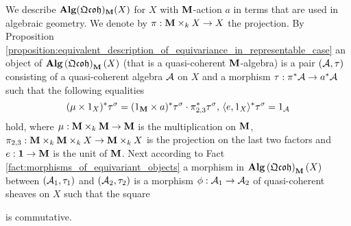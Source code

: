 \begin{remark}\label{remark:description_of_equivariant_qc_algebras_in_the_usual_way}
We describe $\mathbf{Alg}(\mathfrak{Qcoh})_{\mathbf{M}}(X)$ for $X$ with $\mathbf{M}$-action $a$ in terms that are used in algebraic geometry. We denote by $\pi:\mathbf{M}\times_kX\rightarrow X$ the projection. By Proposition \ref{proposition:equivalent_description_of_equivariance_in_representable_case} an object of $\mathbf{Alg}\left(\mathfrak{Qcoh}\right)_{\mathbf{M}}(X)$ (that is a quasi-coherent $\mathbf{M}$-algebra) is a pair $({\mathcal A},\tau)$ consisting of a quasi-coherent algebra ${\mathcal A}$ on $X$ and a morphism $\tau:\pi^*{\mathcal A} \rightarrow a^* {\mathcal A}$ such that the following equalities
$$(\mu \times 1_X)^*\tau^{\sigma} = (1_{\mathbf{M}} \times  a)^*\tau^{\sigma} \cdot \pi_{2,3}^*\tau^{\sigma},\,\langle e, 1_{X} \rangle^*\tau^{\sigma} = 1_{{\mathcal A}}$$
hold, where $\mu: \mathbf{M} \times_k \mathbf{M} \rightarrow \mathbf{M}$ is the multiplication on $\mathbf{M}$, $\pi_{2,3}:\mathbf{M}\times_k  \mathbf{M} \times_k  X \rightarrow \mathbf{M} \times_k X$ is the projection on the last two factors and $e:\mathbf{1}\rightarrow \mathbf{M}$ is the unit of $\mathbf{M}$. Next according to Fact \ref{fact:morphisms_of_equivariant_objects} a morphism in $\mathbf{Alg}\left(\mathfrak{Qcoh}\right)_{\mathbf{M}}(X)$ between $({\mathcal A}_1,\tau_1)$ and $({\mathcal A}_2,\tau_2)$ is a morphism $\phi:{\mathcal A}_1\rightarrow {\mathcal A}_2$ of quasi-coherent sheaves on $X$ such that the square
\begin{center}
\end{center}
is commutative.
\end{remark}

